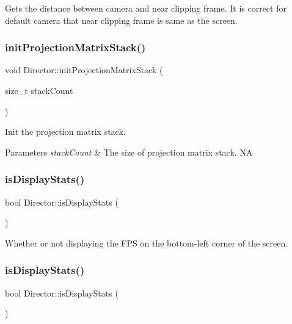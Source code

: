 Gets the distance between camera and near clipping frame. It is correct for default camera that near clipping frame is same as the screen. \mbox{\label{classDirector_a82d147e44c0e54adbc65560371de6328}} 
\subsubsection{\texorpdfstring{init\+Projection\+Matrix\+Stack()}{initProjectionMatrixStack()}}
{\footnotesize\ttfamily void Director\+::init\+Projection\+Matrix\+Stack (\begin{DoxyParamCaption}\item[{size\+\_\+t}]{stack\+Count }\end{DoxyParamCaption})}

Init the projection matrix stack. 
\begin{DoxyParams}{Parameters}
{\em stack\+Count} & The size of projection matrix stack.  NA \\
\hline
\end{DoxyParams}
\mbox{\label{classDirector_a922631f5a39265d96972d63ddb76a7fc}} 
\subsubsection{\texorpdfstring{is\+Display\+Stats()}{isDisplayStats()}\hspace{0.1cm}{\footnotesize\ttfamily [1/2]}}
{\footnotesize\ttfamily bool Director\+::is\+Display\+Stats (\begin{DoxyParamCaption}{ }\end{DoxyParamCaption})\hspace{0.3cm}{\ttfamily [inline]}}

Whether or not displaying the F\+PS on the bottom-\/left corner of the screen. \mbox{\label{classDirector_a922631f5a39265d96972d63ddb76a7fc}} 
\subsubsection{\texorpdfstring{is\+Display\+Stats()}{isDisplayStats()}\hspace{0.1cm}{\footnotesize\ttfamily [2/2]}}
{\footnotesize\ttfamily bool Director\+::is\+Display\+Stats (\begin{DoxyParamCaption}{ }\end{DoxyParamCaption})\hspace{0.3cm}{\ttfamily [inline]}}

